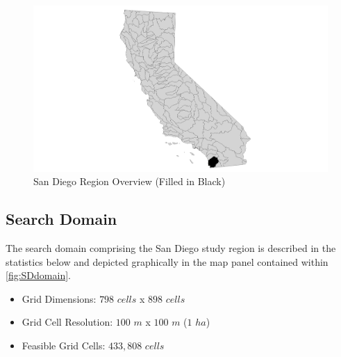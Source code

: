         \begin{figure}[!h]
            \begin{center}
            \includegraphics[width=5.5in]{figures/SanDiego_Overview.png}   
            \caption{San Diego Region Overview (Filled in Black)}
            \label{fig:SDoverview}
            \end{center}
        \end{figure}

    \subsection{Search Domain}
    
    The search domain comprising the San Diego study region is described in the statistics below and depicted graphically in the map panel contained within \ref{fig:SDdomain}.
        
    \begin{itemize}
      \setlength{\itemsep}{0cm}
      \setlength{\parskip}{0cm}
        \item Grid Dimensions: $798$ $cells$ x $898$ $cells$
        \item Grid Cell Resolution: $100$ $m$ x $100$ $m$ ($1$ $ha$)
        \item Feasible Grid Cells: $433,808$ $cells$
    \end{itemize}
    

